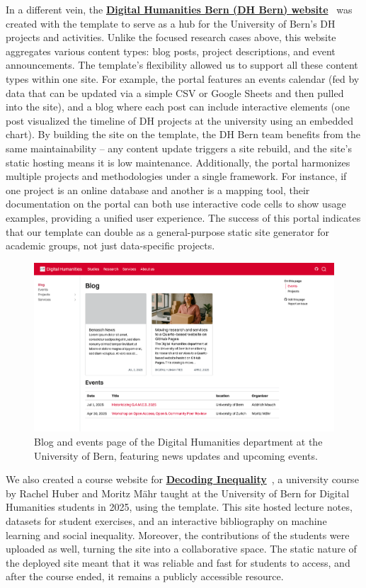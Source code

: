 \documentclass{anthology-ch}         %
\begin{document}
In a different vein, the \href{https://dhbern.github.io/}{\textbf{Digital Humanities Bern (DH Bern) website}}~\cite{digitalhumanitiesbern2025} was created with the template to serve as a hub for the University of Bern's DH projects and activities. Unlike the focused research cases above, this website aggregates various content types: blog posts, project descriptions, and event announcements. The template's flexibility allowed us to support all these content types within one site. For example, the portal features an events calendar (fed by data that can be updated via a simple CSV or Google Sheets and then pulled into the site), and a blog where each post can include interactive elements (one post visualized the timeline of DH projects at the university using an embedded chart). By building the site on the template, the DH Bern team benefits from the same maintainability -- any content update triggers a site rebuild, and the site's static hosting means it is low maintenance. Additionally, the portal harmonizes multiple projects and methodologies under a single framework. For instance, if one project is an online database and another is a mapping tool, their documentation on the portal can both use interactive code cells to show usage examples, providing a unified user experience. The success of this portal indicates that our template can double as a general-purpose static site generator for academic groups, not just data-specific projects.

\begin{figure}[t!]
  \centering
  \includegraphics[width=0.9\linewidth]{images/dhbern.png}
  \caption{Blog and events page of the Digital Humanities department at the University of Bern, featuring news updates and upcoming events.}
  \label{fig-dh-bern}
\end{figure}

We also created a course website for \href{https://dhbern.github.io/decoding-inequality-2025/}{\textbf{Decoding Inequality}}~\cite{huber2024}, a university course by Rachel Huber and Moritz Mähr taught at the University of Bern for Digital Humanities students in 2025, using the template. This site hosted lecture notes, datasets for student exercises, and an interactive bibliography on machine learning and social inequality. Moreover, the contributions of the students were uploaded as well, turning the site into a collaborative space. The static nature of the deployed site meant that it was reliable and fast for students to access, and after the course ended, it remains a publicly accessible resource.
\end{document}
